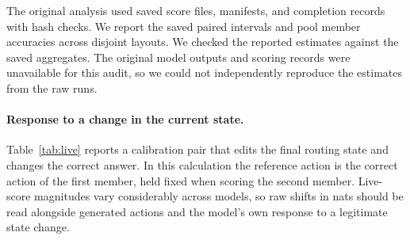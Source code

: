 The original analysis used saved score files, manifests, and completion records with hash checks. We report the saved paired intervals and pool member accuracies across disjoint layouts. We checked the reported estimates against the saved aggregates. The original model outputs and scoring records were unavailable for this audit, so we could not independently reproduce the estimates from the raw runs.

\paragraph{Response to a change in the current state.}
Table~\ref{tab:live} reports a calibration pair that edits the final routing state and changes the correct answer. In this calculation the reference action is the correct action of the first member, held fixed when scoring the second member. Live-score magnitudes vary considerably across models, so raw shifts in nats should be read alongside generated actions and the model's own response to a legitimate state change.
